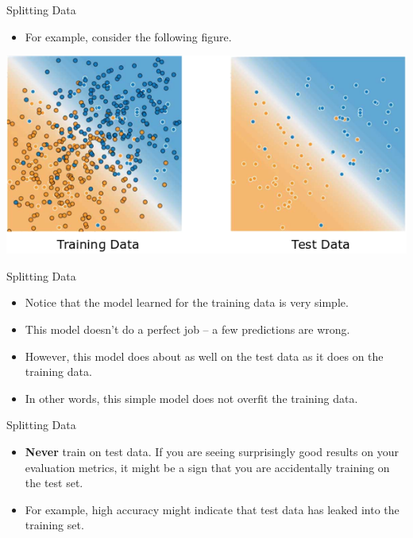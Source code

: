 \documentclass{beamer}
\begin{document}
\begin{frame}{Splitting Data}
\begin{itemize}
    \item For example, consider the following figure. 
\end{itemize}
\medskip
\includegraphics[width=1.0\textwidth]{images/TrainingDataVsTestData.png}
\end{frame}

\begin{frame}{Splitting Data}
\begin{itemize}
    \item Notice that the model learned for the training data is very simple. 
    \item This model doesn't do a perfect job -- a few predictions are wrong. 
    \item However, this model does about as well on the test data as it does on the training data. \item In other words, this simple model does not overfit the training data.
\end{itemize}
\end{frame}

\begin{frame}{Splitting Data}
\begin{itemize}
    \item {\bf Never} train on test data. If you are seeing surprisingly good results on your evaluation metrics, it might be a sign that you are accidentally training on the test set. 
    \item For example, high accuracy might indicate that test data has leaked into the training set.
\end{itemize}
\end{frame}
\end{document}
